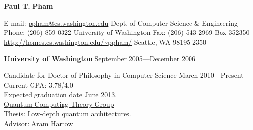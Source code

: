 \documentclass[letter]{article}
\begin{document}
\thispagestyle{empty}           %

\reversemarginpar		%

{\LARGE {\bf Paul T. Pham}}
\par
\vspace{.25in}
E-mail: \href{mailto:ppham@cs.washington.edu}{ppham@cs.washington.edu}
\hspace*{\fill}
Dept. of Computer Science \& Engineering
\linebreak
Phone: (206) 859-0322
\hspace*{\fill}
University of Washington
\linebreak
Fax: (206) 543-2969
\hspace*{\fill}
Box 352350
\linebreak
\url{http://homes.cs.washington.edu/~ppham/}
\hspace*{\fill}
Seattle, WA 98195-2350

\par
\vspace{.25in}

{\bf University of Washington} \hspace*{\fill}September 2005---December 2006
\par
Candidate for Doctor of Philosophy in Computer Science \hspace*{\fill}March 2010---Present\\
Current GPA: 3.78/4.0\\
Expected graduation date June 2013.\\
\href{http://quantum.cs.washington.edu}{Quantum Computing Theory Group}\\
Thesis: Low-depth quantum architectures.\\
Advisor: Aram Harrow
\vspace{\baselineskip}
\par
\end{document}
